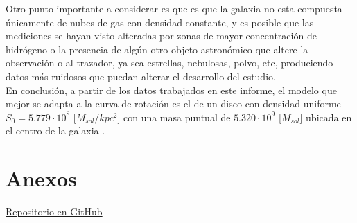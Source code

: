 \documentclass[letterpaper,oneside]{article}
\begin{document}
Otro punto importante a considerar es que es que la galaxia no esta compuesta únicamente de nubes de gas con densidad constante, y es posible que las mediciones se hayan visto alteradas por zonas de mayor concentración de hidrógeno o la presencia de algún otro objeto astronómico que altere la observación o al trazador, ya sea estrellas, nebulosas, polvo, etc, produciendo datos más ruidosos que puedan alterar el desarrollo del estudio.\\

En conclusión, a partir de los datos trabajados en este informe, el modelo que mejor se adapta a la curva de rotación es el de un disco con densidad uniforme $S_0 = 5.779 \cdot 10^{8}$ [$M_{sol}/kpc^{2}$] con una masa puntual de  $5.320 \cdot 10^{9}$ [$M_{sol}$] ubicada en el centro de la galaxia . 

\section{Anexos}
\href{https://github.com/vecheto/astro_experimental/tree/main/Tarea\%202}{Repositorio en GitHub}
\end{document}
